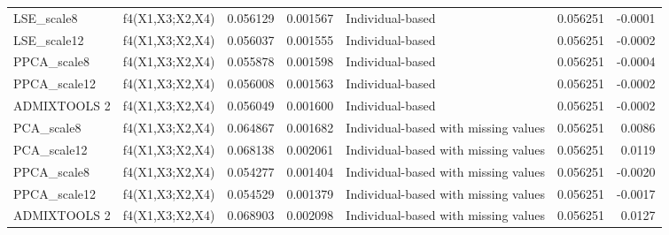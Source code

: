 \begin{tabular}{llrrlrr}
  LSE\_scale8 & f4(X1,X3;X2,X4) & 0.056129 &        0.001567 &                     Individual-based &    0.056251 & -0.0001 \\
 LSE\_scale12 & f4(X1,X3;X2,X4) & 0.056037 &        0.001555 &                     Individual-based &    0.056251 & -0.0002 \\
 PPCA\_scale8 & f4(X1,X3;X2,X4) & 0.055878 &        0.001598 &                     Individual-based &    0.056251 & -0.0004 \\
PPCA\_scale12 & f4(X1,X3;X2,X4) & 0.056008 &        0.001563 &                     Individual-based &    0.056251 & -0.0002 \\
ADMIXTOOLS 2 & f4(X1,X3;X2,X4) & 0.056049 &        0.001600 &                     Individual-based &    0.056251 & -0.0002 \\
  PCA\_scale8 & f4(X1,X3;X2,X4) & 0.064867 &        0.001682 & Individual-based with missing values &    0.056251 &  0.0086 \\
 PCA\_scale12 & f4(X1,X3;X2,X4) & 0.068138 &        0.002061 & Individual-based with missing values &    0.056251 &  0.0119 \\
 PPCA\_scale8 & f4(X1,X3;X2,X4) & 0.054277 &        0.001404 & Individual-based with missing values &    0.056251 & -0.0020 \\
PPCA\_scale12 & f4(X1,X3;X2,X4) & 0.054529 &        0.001379 & Individual-based with missing values &    0.056251 & -0.0017 \\
ADMIXTOOLS 2 & f4(X1,X3;X2,X4) & 0.068903 &        0.002098 & Individual-based with missing values &    0.056251 &  0.0127 \\
\bottomrule
\end{tabular}
